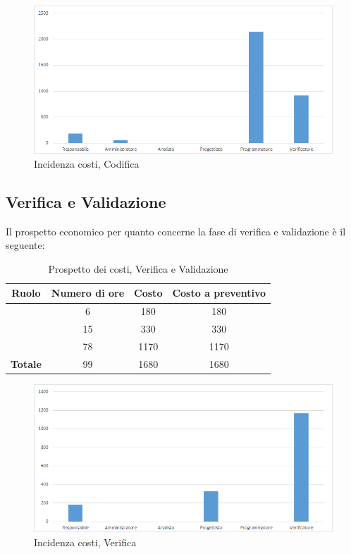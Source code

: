 \begin{figure}[H]
	\centering
	\includegraphics[scale=0.6]{img/8-4.png}
	\caption{Incidenza costi, Codifica}
\end{figure}

\subsection{Verifica e Validazione}
Il prospetto economico per quanto concerne la fase di verifica e validazione è il seguente:


\begin{table}[H]
	\begin{center}
		\begin{tabular}{|c|c|c|c|}
			\hline
			\textbf{Ruolo}	& \textbf{Numero di ore} & \textbf{Costo} & \textbf{Costo a preventivo}\\
			\hline
			\Res	&	6  &	180  &	180	\\
			\hline
			\Prog	&	15  &	330  &	330	\\
			\hline
			\Ver	&	78  &	1170  &	1170	\\
			\hline
			\textbf{Totale}  &	99  &	1680  &	1680	\\
			\hline
		\end{tabular}
	\end{center}
	\caption{Prospetto dei costi, Verifica e Validazione}
\end{table}

\begin{figure}[H]
	\centering
	\includegraphics[scale=0.6]{img/8-5.png}
	\caption{Incidenza costi, Verifica}
\end{figure}

